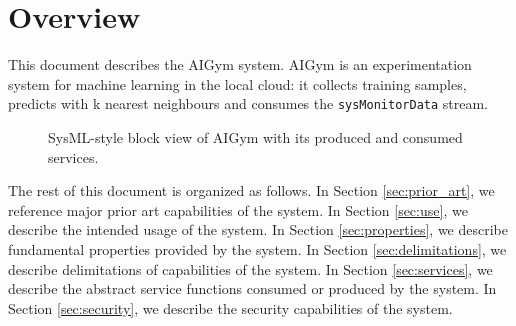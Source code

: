 \documentclass[a4paper]{arrowhead}
\begin{document}
\section{Overview}
\label{sec:overview}

This document describes the AIGym system. AIGym is an experimentation system for machine learning in the local cloud: it collects training samples, predicts with k nearest neighbours and consumes the \texttt{sysMonitorData} stream.

\begin{figure}[ht!]
  \centering
  \caption{SysML-style block view of AIGym with its produced and consumed services.}
  \label{fig:system}
\end{figure}

The rest of this document is organized as follows.
In Section \ref{sec:prior_art}, we reference major prior art capabilities of the system.
In Section \ref{sec:use}, we describe the intended usage of the system.
In Section \ref{sec:properties}, we describe fundamental properties provided by the system.
In Section \ref{sec:delimitations}, we describe delimitations of capabilities of the system.
In Section \ref{sec:services}, we describe the abstract service functions consumed or produced by the system.
In Section \ref{sec:security}, we describe the security capabilities of the system.
\end{document}
